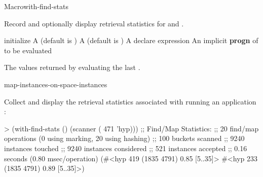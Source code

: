 \documentclass[10pt,twoside,english,pdftex]{article}
\begin{document}

\begin{functiondoc}{Macro}{with-find-stats}%
  {\code{(} \code{)}
    \superstar{}
    \superstar{} 
    \returns{} \superstar}
%
%
%
%
  
\fnsyntax

\fnpurpose 
{}%
%
Record and optionally display retrieval statistics for 
\textbf{} and
\textbf{}.

\fnpackage {}

\fnmodule {}

\fnargs
\begin{args}{initialize}
\arg[initialize] A (default is )
\arg[report] A (default is )
\arg[declaration] A declare expression
\arg[forms] An implicit \textbf{progn} of  to be evaluated
\end{args}

\fnreturns The values returned by evaluating the last .

\begin{alsos}{map-instances-on-space-instances}
\end{alsos}

\fnexample
{}%
Collect and display the retrieval statistics associated with
running an application  :
%
\W\supp
\begin{example}
> (with-find-stats ()
     (scanner ( 471 'hyp)))
;; Find/Map Statistics:
;;        20 find/map operations (0 using marking, 20 using hashing)
;;       100 buckets scanned
;;      9240 instances touched
;;      9240 instances considered
;;       521 instances accepted
;;      0.16 seconds (0.80 msec/operation)
(#<hyp 419 (1835 4791) 0.85 [5..35]>
 #<hyp 233 (1835 4791) 0.89 [5..35]>)
\end{example}

\end{functiondoc}
\end{document}
